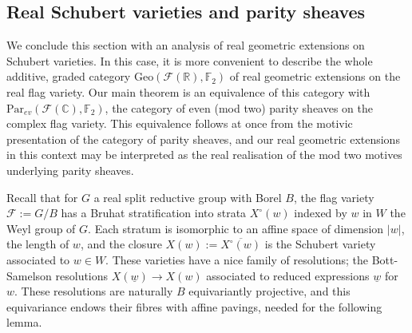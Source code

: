 \documentclass{amsart}
\theoremstyle{definition}
\theoremstyle{remark}
\begin{document}
\subsection{Real Schubert varieties and parity sheaves}
We conclude this section with an analysis of real geometric extensions on Schubert varieties. In this case, it is more convenient to describe the whole additive, graded category $\mathrm{Geo}(\mathscr{F}(\mathbb{R}),\mathbb{F}_2)$ of real geometric extensions on the real flag variety. Our main theorem is an equivalence of this category with $\mathrm{Par}_{ev}(\mathscr{F}(\mathbb{C}),\mathbb{F}_2)$, the category of even (mod two) parity sheaves on the complex flag variety. This equivalence follows at once from the motivic presentation of the category of parity sheaves, and our real geometric extensions in this context may be interpreted as the real realisation of the mod two motives underlying parity sheaves.

Recall that for $G$ a real split reductive group with Borel $B$, the flag variety $\mathscr{F}:=G/B$ has a Bruhat stratification into strata $X^\circ(w)$ indexed by $w$ in $W$ the Weyl group of $G$. Each stratum is isomorphic to an affine space of dimension $|w|$, the length of $w$, and the closure $X(w):=\overline{X^\circ(w)}$ is the Schubert variety associated to $w\in W$. These varieties have a nice family of resolutions; the Bott-Samelson resolutions $X(\underline{w})\to X(w)$ associated to reduced expressions $\underline{w}$ for $w$. These resolutions are naturally $B$ equivariantly projective, and this equivariance endows their fibres with affine pavings, needed for the following lemma.
\end{document}
